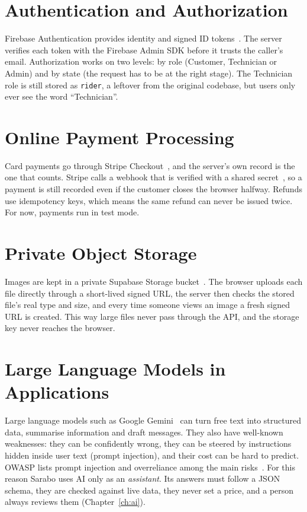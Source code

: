 \documentclass{standalone}
\begin{document}
\section{Authentication and Authorization}
Firebase Authentication provides identity and signed ID tokens~\cite{firebaseauth}. The server verifies each token with the Firebase Admin SDK before it trusts the caller's email. Authorization works on two levels: by role (Customer, Technician or Admin) and by state (the request has to be at the right stage). The Technician role is still stored as \texttt{rider}, a leftover from the original codebase, but users only ever see the word ``Technician''.

\section{Online Payment Processing}
Card payments go through Stripe Checkout~\cite{stripe}, and the server's own record is the one that counts. Stripe calls a webhook that is verified with a shared secret~\cite{stripewebhooks}, so a payment is still recorded even if the customer closes the browser halfway. Refunds use idempotency keys, which means the same refund can never be issued twice. For now, payments run in test mode.

\section{Private Object Storage}
Images are kept in a private Supabase Storage bucket~\cite{supabase}. The browser uploads each file directly through a short-lived signed URL, the server then checks the stored file's real type and size, and every time someone views an image a fresh signed URL is created. This way large files never pass through the API, and the storage key never reaches the browser.

\section{Large Language Models in Applications}
Large language models such as Google Gemini~\cite{gemini} can turn free text into structured data, summarise information and draft messages. They also have well-known weaknesses: they can be confidently wrong, they can be steered by instructions hidden inside user text (prompt injection), and their cost can be hard to predict. OWASP lists prompt injection and overreliance among the main risks~\cite{owaspllm}. For this reason Sarabo uses AI only as an \emph{assistant}. Its answers must follow a JSON schema, they are checked against live data, they never set a price, and a person always reviews them (Chapter~\ref{ch:ai}).
\end{document}

